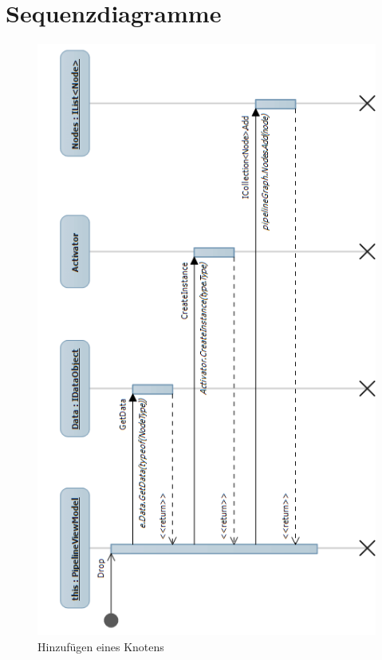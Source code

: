 \section{Sequenzdiagramme}

\begin{figure}[h!]
\begin{center}
\includegraphics[height=0.7\textheight]{Diagrams/drop.png}
\end{center}
\caption{Hinzufügen eines Knotens}
\end{figure}

